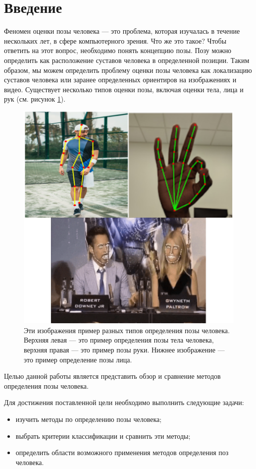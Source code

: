 
\chapter*{Введение}


Феномен оценки позы человека --- это проблема, которая изучалась в течение нескольких лет, в сфере компьютерного зрения. Что же это такое? Чтобы ответить на этот вопрос, необходимо понять концепцию позы. Позу можно определить как расположение суставов человека в определенной позиции. Таким образом, мы можем определить проблему оценки позы человека как локализацию суставов человека или заранее определенных ориентиров на изображениях и видео. Существует несколько типов оценки позы, включая оценки тела, лица и рук (см. рисунок \ref{img:human,hand,face}).

\begin{figure}[ht!]
	\centering
	\includegraphics[width=0.96\linewidth]{assets/thefirst.png}
	\caption{Эти изображения пример разных типов определения позы человека. Верхняя левая --- это пример определения позы тела человека, верхняя правая --- это пример позы руки. Нижнее изображение --- это пример определение позы лица.}
	\label{img:human,hand,face}
\end{figure}


Целью данной работы является представить обзор и сравнение методов определения позы человека. 

Для достижения поставленной цели необходимо выполнить следующие задачи:
\begin{itemize}
	\item изучить методы по определению позы человека;
	\item выбрать критерии классификации и сравнить эти методы;
	\item определить области возможного применения методов определения поз человека.
\end{itemize}